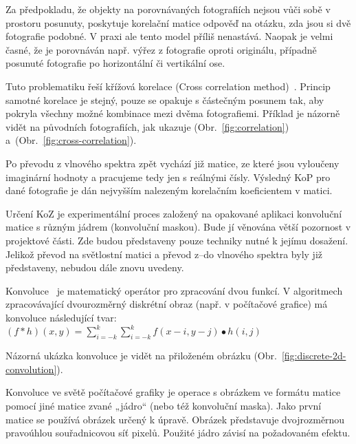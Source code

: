 Za předpokladu, že objekty na porovnávaných fotografiích nejsou vůči sobě v prostoru posunuty, poskytuje korelační matice odpověď na otázku, zda jsou si dvě fotografie podobné. V praxi ale tento model příliš nenastává. Naopak je velmi časné, že je porovnáván např. výřez z fotografie oproti originálu, případně posunuté fotografie po horizontální či vertikální ose.

Tuto problematiku řeší křížová korelace (Cross correlation method)~\cite{cross-correlation}. Princip samotné korelace je stejný, pouze se opakuje s částečným posunem tak, aby pokryla všechny možné kombinace mezi dvěma fotografiemi. Příklad je názorně vidět na původních fotografiích, jak ukazuje (Obr.~\ref{fig:correlation}) a~(Obr.~\ref{fig:cross-correlation}).



Po převodu z vlnového spektra zpět vychází již matice, ze které jsou vyloučeny imaginární hodnoty a pracujeme tedy jen s reálnými čísly. Výsledný KoP pro dané fotografie je dán nejvyšším nalezeným korelačním koeficientem v matici.

Určení KoZ je experimentální proces založený na opakované aplikaci konvoluční matice s různým jádrem (konvoluční maskou). Bude jí věnována větší pozornost v projektové části. Zde budou představeny pouze techniky nutné k jejímu dosažení. Jelikož převod na světlostní matici a převod z--do vlnového spektra byly již představeny, nebudou dále znovu uvedeny.

Konvoluce~\cite{convolition} je matematický operátor pro zpracování dvou funkcí. V algoritmech zpracovávající dvourozměrný diskrétní obraz (např. v počítačové grafice) má konvoluce následující tvar:
$ (f*h)(x,y)=\sum\limits_{i=-k}^{k} \sum\limits_{i=-k}^{k} f(x-i,y-j) \bullet h(i,j)$

Názorná ukázka konvoluce je vidět na přiloženém obrázku (Obr.~\ref{fig:discrete-2d-convolution}).


Konvoluce ve světě počítačové grafiky je operace s obrázkem ve formátu matice pomocí jiné matice zvané „jádro“ (nebo též konvoluční maska). Jako první matice se používá obrázek určený k úpravě. Obrázek představuje dvojrozměrnou pravoúhlou souřadnicovou síť pixelů. Použité jádro závisí na požadovaném efektu.

